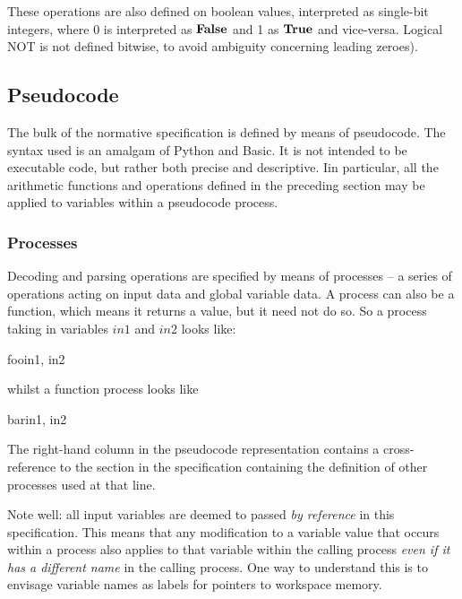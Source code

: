 These operations are also defined on boolean values, interpreted as single-bit integers, 
where 0 is interpreted as $\text{\bf{False}}$ and 1 as $\text{\bf{True}}$ and vice-versa. Logical NOT is 
not defined bitwise, to avoid ambiguity concerning leading zeroes).


\subsection{Pseudocode}
\label{pseudocode}

The bulk of the normative specification is defined by means of pseudocode. 
The syntax used is an amalgam of Python and Basic. It is not intended
to be executable code, but rather both precise and descriptive. 
Iin particular, all the arithmetic functions and
operations defined in the preceding section may be applied to variables within
a pseudocode process.

\subsubsection{Processes}
\label{functionsprocesses}

Decoding and parsing operations are specified by means of processes
 -- a series of operations acting on input data and global variable data. 
A process can also be a function, which means it returns a value, but
it need not do so. So a process
taking in variables $in1$ and $in2$ looks like:

\begin{pseudo}{foo}{in1, in2}
\bsCODE{\hdots}
\end{pseudo}

whilst a function process looks like

\begin{pseudo}{bar}{in1, in2}
\bsCODE{\hdots}
\end{pseudo}

The right-hand column in the pseudocode representation contains a cross-reference to the 
section in the specification containing the definition of other processes used at that line.

Note well: all input variables are deemed to passed {\em by reference} in this
specification. This means that any modification to a variable value that
occurs within a process also applies to that variable within the calling process
{\em even if it has a different name} in the calling process. One way to understand
this is to envisage variable names as labels for pointers to workspace memory.

